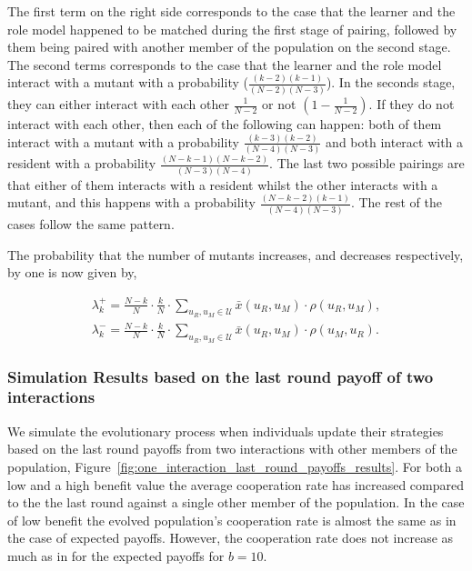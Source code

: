 \documentclass[11pt]{article}
\theoremstyle{plainCl1}
\theoremstyle{plainCl2}
\begin{document}
The first term on the right side corresponds to the case that the learner and
the role model happened to be matched during the first stage of pairing,
followed by them being paired with another member of the population on the
second stage. The second terms corresponds to the case that the learner and the
role model interact with a mutant with a probability ($\frac{\left(k - 2\right)
\left(k - 1\right)}{(N\!-\!2)(N\!-\!3)}$). In the seconds stage, they can either
interact with each other $\frac{1}{N - 2}$ or not $(1 - \frac{1}{N - 2})$. If
they do not interact with each other, then each of the following can happen:
both of them interact with a mutant with a probability
$\frac{(k-3)(k-2)}{(N-4)(N-3)}$ and both interact with a resident with a
probability $\frac{(N-k-1)(N-k-2)}{(N-3)(N-4)}$. The last two possible pairings
are that either of them interacts with a resident whilst the other interacts
with a mutant, and this happens with a probability
$\frac{(N-k-2)(k-1)}{(N-4)(N-3)}$. The rest of the cases follow the same
pattern.

The probability that the number of mutants increases, and decreases respectively,
by one is now given by,

\begin{align}
\lambda^+_k=\frac{N\!-\!k}{N}\cdot \frac{k}{N}\cdot \sum_{u_{R},u_{M}\in\mathcal{U}} \bar{x}(u_{R},u_{M})\cdot \rho(u_{R},u_{M}), \\
\lambda^-_k=\frac{N\!-\!k}{N}\cdot \frac{k}{N}\cdot \sum_{u_{R},u_{M}\in\mathcal{U}} \bar{x}(u_{R},u_{M})\cdot \rho(u_{M},u_{R}).
\end{align}

\subsubsection*{Simulation Results based on the last round payoff of two interactions}

We simulate the evolutionary process when individuals update their strategies
based on the last round payoffs from two interactions with other members of the
population, Figure~\ref{fig:one_interaction_last_round_payoffs_results}. For
both a low and a high benefit value the average cooperation rate has increased
compared to the the last round against a single other member of the population.
In the case of low benefit the evolved population's cooperation rate is almost
the same as in the case of expected payoffs. However, the cooperation rate does
not increase as much as in for the expected payoffs for \(b=10\).
\end{document}
